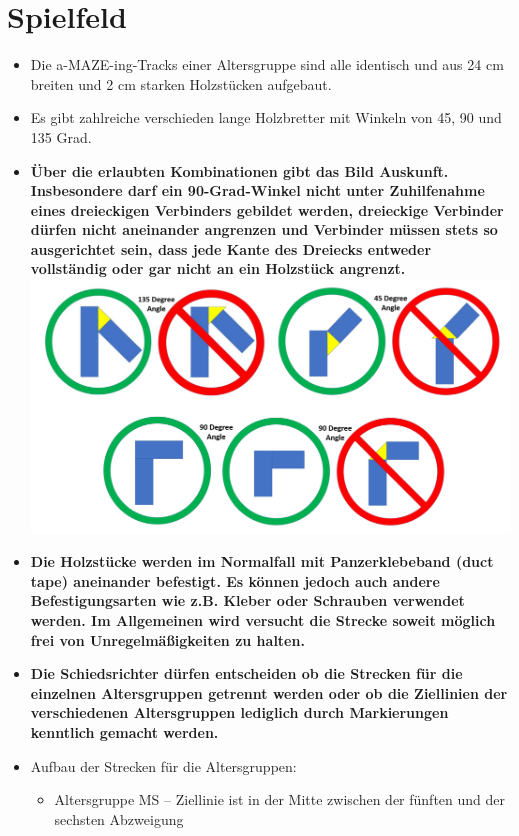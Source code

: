 \documentclass[a4paper,12pt]{article}
\begin{document}
\section{Spielfeld}
\begin{itemize}
\item Die a-MAZE-ing-Tracks einer Altersgruppe sind alle identisch und aus 24 cm breiten und 2 cm starken
Holzstücken aufgebaut.
\item Es gibt zahlreiche verschieden lange Holzbretter mit Winkeln von 45, 90 und 135
Grad.
\item \textbf{Über die erlaubten Kombinationen gibt das Bild Auskunft. Insbesondere darf ein
90-Grad-Winkel nicht unter Zuhilfenahme eines dreieckigen Verbinders gebildet werden, dreieckige 
Verbinder dürfen nicht aneinander angrenzen und Verbinder müssen stets so ausgerichtet sein, dass
jede Kante des Dreiecks entweder vollständig oder gar nicht an ein Holzstück angrenzt. \\}
\includegraphics[width=1.0\textwidth]{amazeing_allowed.png}
\item \textbf{Die Holzstücke werden im Normalfall mit Panzerklebeband (duct tape) aneinander befestigt.
Es können jedoch auch andere Befestigungsarten wie z.B. Kleber oder Schrauben verwendet werden.
Im Allgemeinen wird versucht die Strecke soweit möglich frei von Unregelmäßigkeiten zu halten.}
\item \textbf{Die Schiedsrichter dürfen entscheiden ob die Strecken für die einzelnen Altersgruppen
getrennt werden oder ob die Ziellinien der verschiedenen Altersgruppen lediglich durch Markierungen
kenntlich gemacht werden.}
\item Aufbau der Strecken für die Altersgruppen:
\begin{itemize}
\item Altersgruppe MS – Ziellinie ist in der Mitte zwischen der fünften und der sechsten Abzweigung

\end{itemize}
\end{itemize}
\end{document}
